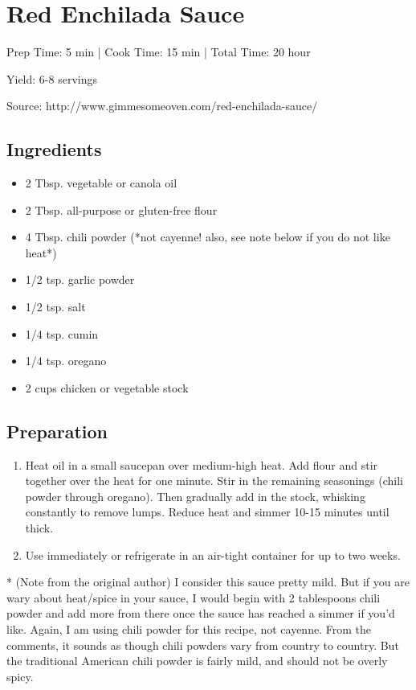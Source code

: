 \section{Red Enchilada Sauce}\label{red-enchilada-sauce}

\begin{center}
Prep Time: 5 min |
Cook Time: 15 min |
Total Time: 20 hour

\noindent Yield: 6-8 servings

\vspace{1em}

Source: http://www.gimmesomeoven.com/red-enchilada-sauce/
\end{center}

\subsection{Ingredients}
\begin{multicols}{2}
\begin{itemize}
    \item 2 Tbsp. vegetable or canola oil
    \item 2 Tbsp. all-purpose or gluten-free flour
    \item 4 Tbsp. chili powder (*not cayenne! also, see note below if you do not like heat*)
    \item 1/2 tsp. garlic powder
    \item 1/2 tsp. salt
    \item 1/4 tsp. cumin
    \item 1/4 tsp. oregano
    \item 2 cups chicken or vegetable stock
\end{itemize}
\end{multicols}

\subsection{Preparation}
\begin{enumerate}
    \item Heat oil in a small saucepan over medium-high heat. Add flour and stir together over the heat for one minute. Stir in the remaining seasonings (chili powder through oregano). Then gradually add in the stock, whisking constantly to remove lumps. Reduce heat and simmer 10-15 minutes until thick.
    \item Use immediately or refrigerate in an air-tight container for up to two weeks.
\end{enumerate}
* (Note from the original author) I consider this sauce pretty mild.
But if you are wary about heat/spice in your sauce, I would begin with 2 tablespoons chili powder and add more from there once the sauce has reached a simmer if you'd like.
Again, I am using chili powder for this recipe, not cayenne.
From the comments, it sounds as though chili powders vary from country to country.
But the traditional American chili powder is fairly mild, and should not be overly spicy.

